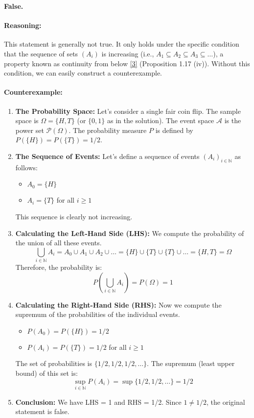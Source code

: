 \documentclass[11pt,a4paper]{article}
\begin{document}
\textbf{False.}

\paragraph{Reasoning:}
This statement is generally not true. It only holds under the specific condition that the sequence of sets $(A_i)$ is increasing (i.e., $A_1 \subseteq A_2 \subseteq A_3 \subseteq \dots$), a property known as continuity from below \hyperlink{note3}{[3]} (Proposition 1.17 (iv)). Without this condition, we can easily construct a counterexample.

\paragraph{Counterexample:}
\begin{enumerate}
    \item \textbf{The Probability Space:} Let's consider a single fair coin flip. The sample space is $\Omega = \{H, T\}$ (or $\{0, 1\}$ as in the solution). The event space $\mathcal{A}$ is the power set $\mathcal{P}(\Omega)$. The probability measure $P$ is defined by $P(\{H\}) = P(\{T\}) = 1/2$.

    \item \textbf{The Sequence of Events:} Let's define a sequence of events $(A_i)_{i \in \mathbb{N}}$ as follows:
    \begin{itemize}
        \item $A_0 = \{H\}$
        \item $A_i = \{T\}$ for all $i \geq 1$
    \end{itemize}
    This sequence is clearly not increasing.

    \item \textbf{Calculating the Left-Hand Side (LHS):} We compute the probability of the union of all these events.
    \[
        \bigcup_{i \in \mathbb{N}} A_i = A_0 \cup A_1 \cup A_2 \cup \dots = \{H\} \cup \{T\} \cup \{T\} \cup \dots = \{H, T\} = \Omega
    \]
    Therefore, the probability is:
    \[
        P\left(\bigcup_{i \in \mathbb{N}} A_i\right) = P(\Omega) = 1
    \]

    \item \textbf{Calculating the Right-Hand Side (RHS):} Now we compute the supremum of the probabilities of the individual events.
    \begin{itemize}
        \item $P(A_0) = P(\{H\}) = 1/2$
        \item $P(A_i) = P(\{T\}) = 1/2$ for all $i \geq 1$
    \end{itemize}
    The set of probabilities is $\{1/2, 1/2, 1/2, \dots\}$. The supremum (least upper bound) of this set is:
    \[
        \sup_{i \in \mathbb{N}} P(A_i) = \sup\{1/2, 1/2, \dots\} = 1/2
    \]

    \item \textbf{Conclusion:} We have LHS = 1 and RHS = 1/2. Since $1 \neq 1/2$, the original statement is false.
\end{enumerate}
\end{document}
